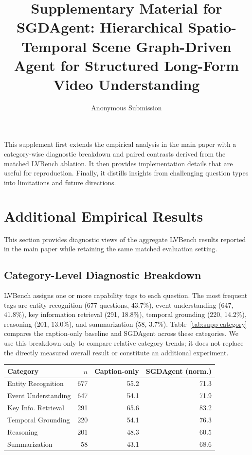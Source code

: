 \documentclass[letterpaper]{article}
\title{Supplementary Material for SGDAgent: Hierarchical Spatio-Temporal Scene Graph-Driven Agent for Structured Long-Form Video Understanding}
\author{Anonymous Submission}
\begin{document}
\maketitle

\noindent
This supplement first extends the empirical analysis in the main paper with a category-wise diagnostic breakdown and paired contrasts derived from the matched LVBench ablation.
It then provides implementation details that are useful for reproduction.
Finally, it distills insights from challenging question types into limitations and future directions.


\section{Additional Empirical Results}
\label{sec:supp-analysis}

This section provides diagnostic views of the aggregate LVBench results reported in the main paper while retaining the same matched evaluation setting.

\subsection{Category-Level Diagnostic Breakdown}

LVBench assigns one or more capability tags to each question.
The most frequent tags are entity recognition (677 questions, 43.7\%), event understanding (647, 41.8\%), key information retrieval (291, 18.8\%), temporal grounding (220, 14.2\%), reasoning (201, 13.0\%), and summarization (58, 3.7\%).
Table~\ref{tab:supp-category} compares the caption-only baseline and SGDAgent across these categories.
We use this breakdown only to compare relative category trends; it does not replace the directly measured overall result or constitute an additional experiment.

\begin{center}
  \centering
  \small
  \setlength{\tabcolsep}{3pt}
  \begin{tabular}{@{}lrrr@{}}
    \toprule
    \textbf{Category} &
    \textbf{$n$} &
    \textbf{Caption-only} &
    \textbf{SGDAgent (norm.)} \\
    \midrule
    Entity Recognition & 677 & 55.2 & 71.3 \\
    Event Understanding & 647 & 54.1 & 71.9 \\
    Key Info. Retrieval & 291 & 65.6 & 83.2 \\
    Temporal Grounding & 220 & 54.1 & 76.3 \\
    Reasoning & 201 & 48.3 & 60.5 \\
    Summarization & 58 & 43.1 & 68.6 \\
    \bottomrule
  \end{tabular}
  \label{tab:supp-category}
\end{center}
\end{document}
